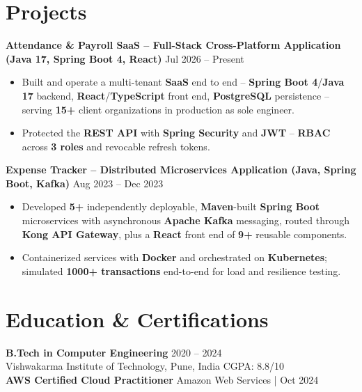 \documentclass[a4paper,10pt]{article}
\begin{document}
\section*{Projects}

\textbf{Attendance \& Payroll SaaS -- Full-Stack Cross-Platform Application (Java 17, Spring Boot 4, React)} \hfill Jul 2026 -- Present
\begin{itemize}[leftmargin=*]
    \item Built and operate a multi-tenant \textbf{SaaS} end to end -- \textbf{Spring Boot 4}/\textbf{Java 17} backend, \textbf{React}/\textbf{TypeScript} front end, \textbf{PostgreSQL} persistence -- serving \textbf{15+} client organizations in production as sole engineer.
    \item Protected the \textbf{REST API} with \textbf{Spring Security} and \textbf{JWT} -- \textbf{RBAC} across \textbf{3 roles} and revocable refresh tokens.
\end{itemize}

\textbf{Expense Tracker -- Distributed Microservices Application (Java, Spring Boot, Kafka)} \hfill Aug 2023 -- Dec 2023
\begin{itemize}[leftmargin=*]
    \item Developed \textbf{5+} independently deployable, \textbf{Maven}-built \textbf{Spring Boot} microservices with asynchronous \textbf{Apache Kafka} messaging, routed through \textbf{Kong API Gateway}, plus a \textbf{React} front end of \textbf{9+} reusable components.
    \item Containerized services with \textbf{Docker} and orchestrated on \textbf{Kubernetes}; simulated \textbf{1000+ transactions} end-to-end for load and resilience testing.
\end{itemize}

\section*{Education \& Certifications}
\textbf{B.Tech in Computer Engineering} \hfill 2020 -- 2024 \\
Vishwakarma Institute of Technology, Pune, India \hfill CGPA: 8.8/10 \\
\textbf{AWS Certified Cloud Practitioner} \hfill Amazon Web Services \;|\; Oct 2024
\end{document}
